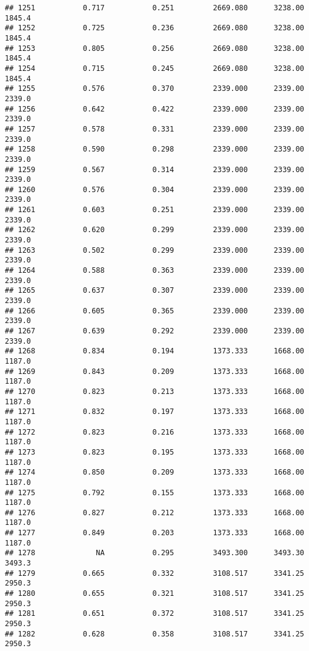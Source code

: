 \documentclass[
]{article}
\begin{document}
\begin{verbatim}
## 1251           0.717           0.251         2669.080      3238.00       1845.4
## 1252           0.725           0.236         2669.080      3238.00       1845.4
## 1253           0.805           0.256         2669.080      3238.00       1845.4
## 1254           0.715           0.245         2669.080      3238.00       1845.4
## 1255           0.576           0.370         2339.000      2339.00       2339.0
## 1256           0.642           0.422         2339.000      2339.00       2339.0
## 1257           0.578           0.331         2339.000      2339.00       2339.0
## 1258           0.590           0.298         2339.000      2339.00       2339.0
## 1259           0.567           0.314         2339.000      2339.00       2339.0
## 1260           0.576           0.304         2339.000      2339.00       2339.0
## 1261           0.603           0.251         2339.000      2339.00       2339.0
## 1262           0.620           0.299         2339.000      2339.00       2339.0
## 1263           0.502           0.299         2339.000      2339.00       2339.0
## 1264           0.588           0.363         2339.000      2339.00       2339.0
## 1265           0.637           0.307         2339.000      2339.00       2339.0
## 1266           0.605           0.365         2339.000      2339.00       2339.0
## 1267           0.639           0.292         2339.000      2339.00       2339.0
## 1268           0.834           0.194         1373.333      1668.00       1187.0
## 1269           0.843           0.209         1373.333      1668.00       1187.0
## 1270           0.823           0.213         1373.333      1668.00       1187.0
## 1271           0.832           0.197         1373.333      1668.00       1187.0
## 1272           0.823           0.216         1373.333      1668.00       1187.0
## 1273           0.823           0.195         1373.333      1668.00       1187.0
## 1274           0.850           0.209         1373.333      1668.00       1187.0
## 1275           0.792           0.155         1373.333      1668.00       1187.0
## 1276           0.827           0.212         1373.333      1668.00       1187.0
## 1277           0.849           0.203         1373.333      1668.00       1187.0
## 1278              NA           0.295         3493.300      3493.30       3493.3
## 1279           0.665           0.332         3108.517      3341.25       2950.3
## 1280           0.655           0.321         3108.517      3341.25       2950.3
## 1281           0.651           0.372         3108.517      3341.25       2950.3
## 1282           0.628           0.358         3108.517      3341.25       2950.3

\end{verbatim}
\end{document}
